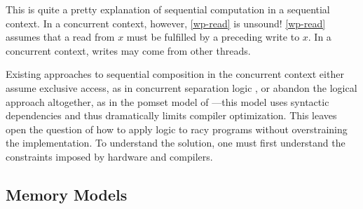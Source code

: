 This is quite a pretty explanation of sequential computation in a sequential
context.  In a concurrent context, however, \ref{wp-read} is unsound!
\ref{wp-read} assumes that a read from
$x$ must be fulfilled by a preceding write to
$x$.  In a concurrent context, writes may come from other threads.

Existing approaches to sequential composition in the concurrent context
either assume exclusive access, as in concurrent separation logic
\cite{OHearn:2007:RCL:1235896.1236121}, or abandon the logical approach
altogether, as in the pomset model of
\citet{DBLP:journals/corr/abs-1804-04214}---this model uses syntactic
dependencies and thus dramatically limits compiler optimization.  This leaves
open the question of how to apply logic to racy programs without
overstraining the implementation.  To understand the solution, one must first
understand the constraints imposed by hardware and compilers.












\subsection{Memory Models}

